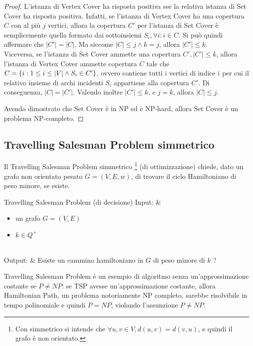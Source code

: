 \begin{proof}
    L'istanza di Vertex Cover ha risposta positiva sse la relativa istanza di Set Cover ha risposta positiva.
    Infatti, se l'istanza di Vertex Cover ha una copertura $C$ con al più $j$ vertici, allora la copertura $C'$ per l'istanza di Set Cover è semplicemente quella formato dai sottoinsiemi $S_i, \forall i : i \in C$. Si può quindi affermare che $|C'| = |C|$. Ma siccome $|C| \le j \land k = j$, allora $|C'| \le k$.\\
    Viceversa, se l'istanza di Set Cover ammette una copertura $C', |C'| \le k$, allora l'istanza di Vertex Cover ammette copertura $C$ tale che $C = \left\{i : 1 \le i \le |V| \land S_i \in C'\right\}$, ovvero contiene tutti i vertici di indice $i$ per cui il relativo insieme di archi incidenti $S_i$ appartiene alla copertura $C'$. Di conseguenza, $|C| = |C'|$.
    Valendo inoltre $|C'| \le k$, e $j = k$, allora $|C| \le j$.

    Avendo dimostrato che Set Cover è in NP ed è NP-hard, allora Set Cover è un problema NP-completo.
\end{proof}

\subsection*{Travelling Salesman Problem simmetrico}
Il Travelling Salesman Problem simmetrico \footnote{Con simmetrico si intende che $\forall u, v \in V, d(u,v)=d(v,u)$, e quindi il grafo è non orientato.} (di ottimizzazione) chiede, dato un grafo non orientato pesato $G = (V, E, w)$, di trovare il ciclo Hamiltoniano di peso minore, se esiste.
\begin{problem}[lined]{Travelling Salesman Problem (di decisione)}
    Input: & \begin{minipage}[t]{0.8\linewidth}\begin{itemize}
        \setlength\itemsep{0em}
        \item un grafo $G = (V, E)$
        \item $k \in Q^+$
    \end{itemize}\end{minipage}\\
    Output: & Esiste un cammino hamiltoniano in $G$ di peso minore di $k$ ?
\end{problem}

Travelling Salesman Problem è un esempio di algoritmo senza un'approssimazione costante se $P \neq NP$: se TSP avesse un'approssimazione costante, allora Hamiltonian Path, un problema notoriamente NP completo, sarebbe risolvibile in tempo polinomiale e quindi $P = NP$, violando l'assunzione $P \neq NP$.

